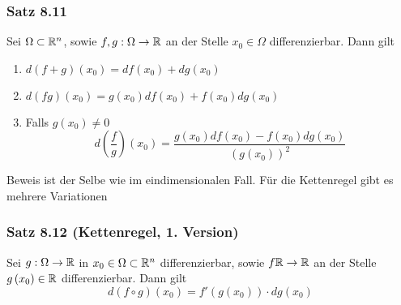 \subsubsection*{Satz 8.11}
Sei $\Omega\subset\mathbb{R}^n$, sowie $f,g:\Omega\to\mathbb{R}$ an der Stelle $x_0\in\Omega$ differenzierbar. Dann gilt \begin{enumerate}
\item $d\left( {f + g} \right)\left( {{x_0}} \right) = df\left( {{x_0}} \right) + dg\left( {{x_0}} \right)$
\item $d\left( {fg} \right)\left( {{x_0}} \right) = g\left( {{x_0}} \right)df\left( {{x_0}} \right) + f\left( {{x_0}} \right)dg\left( {{x_0}} \right)$
\item Falls $g\left( x_0\right)\not=0$ \[d\left( {\frac{f}{g}} \right)\left( {{x_0}} \right) = \frac{{g\left( {{x_0}} \right)df\left( {{x_0}} \right) - f\left( {{x_0}} \right)dg\left( {{x_0}} \right)}}{{{{\left( {g\left( {{x_0}} \right)} \right)}^2}}}\]
\end{enumerate}
Beweis ist der Selbe wie im eindimensionalen Fall. Für die Kettenregel gibt es mehrere Variationen

\subsubsection*{Satz 8.12 (Kettenregel, 1. Version)}
Sei $g:\Omega\to\mathbb{R}$ in $x_0\in\Omega\subset\mathbb{R}^n$ differenzierbar, sowie $f\mathbb{R}\to\mathbb{R}$ an der Stelle $g\left( x_0\right)\in\mathbb{R}$ differenzierbar. Dann gilt \[d\left( {f \circ g} \right)\left( {{x_0}} \right) = f'\left( {g\left( {{x_0}} \right)} \right) \cdot dg\left( {{x_0}} \right)\]


%
%
%
%
%
%

